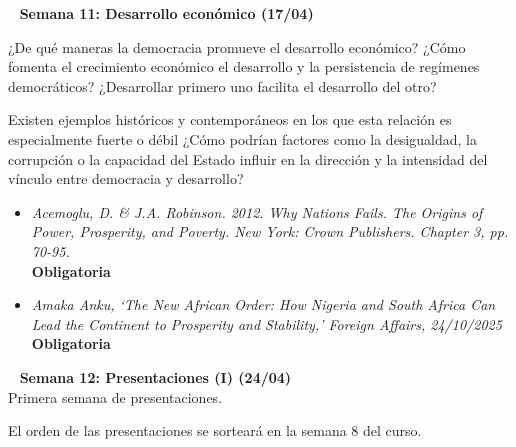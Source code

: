 \documentclass[11pt, a4paper]{article}
\begin{document}
\begin{center} 
\begin{minipage}{6in}
\begin{flushleft}
{\color{darkgreen}{\Rectangle}} ~ \textbf{{\large{Semana 11: Desarrollo económico  (17/04)}}} 
\end{flushleft}

¿De qué maneras la democracia promueve el desarrollo económico? ¿Cómo fomenta el crecimiento económico el desarrollo y la persistencia de regímenes democráticos? ¿Desarrollar primero uno facilita el desarrollo del otro? \vspace{0,5em}

Existen ejemplos históricos y contemporáneos en los que esta relación es  especialmente fuerte o débil ¿Cómo podrían factores como la desigualdad, la corrupción o la capacidad del Estado influir en la dirección y la intensidad del vínculo entre democracia y desarrollo?

\begin{itemize}
     \item \emph{Acemoglu, D. \& J.A. Robinson. 2012.  Why Nations Fails. The Origins of Power, Prosperity, and Poverty. New York: Crown Publishers. Chapter 3, pp. 70-95.} \\ \textbf{Obligatoria}

     \item \emph{Amaka Anku, ‘The New African Order: How Nigeria and South Africa Can Lead the Continent to Prosperity and Stability,’ Foreign Affairs, 24/10/2025} \textbf{Obligatoria} 
\end{itemize}
\end{minipage}
\end{center}

\begin{center} 
\begin{minipage}{6in}
\begin{flushleft}
{\color{darkgreen}{\Rectangle}} ~ \textbf{{\large{Semana 12: Presentaciones (I) (24/04)}}} \vspace{0,5em}\\

Primera semana de presentaciones.\vspace{0,5em}

El orden de las presentaciones se sorteará en la semana 8 del curso.
\end{flushleft}
\end{minipage}
\end{center}
\end{document}
